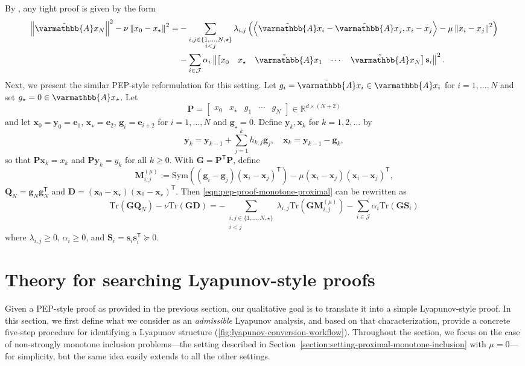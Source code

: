 \documentclass{article}
\theoremstyle{definition}
\theoremstyle{plain}
\newcommand{\ve}{{\mathbf{e}}}
\newcommand{\vg}{{\mathbf{g}}}
\newcommand{\vs}{{\mathbf{s}}}
\newcommand{\vx}{{\mathbf{x}}}
\newcommand{\vy}{{\mathbf{y}}}
\newcommand{\vD}{{\mathbf{D}}}
\newcommand{\vG}{{\mathbf{G}}}
\newcommand{\vM}{{\mathbf{M}}}
\newcommand{\vP}{{\mathbf{P}}}
\newcommand{\vQ}{{\mathbf{Q}}}
\newcommand{\vS}{{\mathbf{S}}}
\newcommand{\cJ}{{\mathcal{J}}}
\newcommand{\reals}{\mathbb{R}}
\newcommand{\opA}{{\varmathbb{A}}}
\newcommand{\inprod}[2]{\left\langle #1,#2 \right\rangle}
\newcommand{\sqnorm}[1]{\left\| #1 \right\|^2}
\newcommand{\topa}{\tilde{\opA}}
\newcommand{\transpose}{\mathsf{T}}
\begin{document}
By \citep{RyuTaylorBergelingGiselsson2020_operator}, any tight proof is given by the form
\begin{align}
\label{eqn:pep-proof-monotone-proximal}
\begin{aligned}
    \sqnorm{\topa x_N} - \nu \sqnorm{x_0 - x_\star} = & -\sum_{\substack{i,j \in \{1,\dots,N,\star\}\\ i<j}} \lambda_{i,j} \left( \inprod{\tilde{\opA} x_i - \tilde{\opA} x_j}{x_i - x_j} 
    - \mu \sqnorm{x_i - x_j} \right) \\
    & - \sum_{i\in \cJ} \alpha_i \sqnorm{\begin{bmatrix} x_0 & x_\star & \tilde{\opA} x_1 & \cdots & \tilde{\opA} x_N \end{bmatrix} \vs_i} .
\end{aligned}
\end{align}
Next, we present the similar PEP-style reformulation for this setting.
Let $g_i=\tilde{\opA}x_i\in \opA x_i$ for $i=1,\dots,N$ and set $g_\star = 0 \in \opA x_\star$.
Let
\[
    \vP = \begin{bmatrix}x_0 & x_\star & g_1 & \cdots & g_N\end{bmatrix}\in\reals^{d\times(N+2)}
\]
and let $\vx_0=\vy_0=\ve_1$, $\vx_\star=\ve_2$, $\vg_i=\ve_{i+2}$ for $i=1,\dots,N$ and $\vg_\star=0$.
Define $\vy_k, \vx_k$ for $k=1,2,\dots$ by
\[
    \vy_{k} = \vy_{k-1} + \sum_{j=1}^k h_{k,j} \vg_j , \quad \vx_k = \vy_{k-1} - \vg_k ,
\]
so that $\vP\vx_k=x_k$ and $\vP\vy_k = y_k$ for all $k\ge 0$.
With $\vG=\vP^\transpose\vP$, define
\[
    \vM_{i,j}^{(\mu)}
    :=
    \mathrm{Sym}\left((\vg_i-\vg_j)(\vx_i-\vx_j)^\transpose\right)
    -\mu(\vx_i-\vx_j)(\vx_i-\vx_j)^\transpose ,
\]
$\vQ_N=\vg_N\vg_N^\transpose$ and $\vD=(\vx_0-\vx_\star)(\vx_0-\vx_\star)^\transpose$.
Then \eqref{eqn:pep-proof-monotone-proximal} can be rewritten as
\[
    \mathrm{Tr}(\vG\vQ_N)-\nu\mathrm{Tr}(\vG\vD)
    =
    -\sum_{\substack{i,j \in \{1,\dots,N,\star\}\\ i<j}}\lambda_{i,j}\mathrm{Tr}(\vG\vM_{i,j}^{(\mu)})
    -\sum_{i\in\cJ}\alpha_i\mathrm{Tr}(\vG\vS_i)
\]
where $\lambda_{i,j}\ge0$, $\alpha_i\ge0$, and $\vS_i=\vs_i\vs_i^\transpose \succeq 0$.




\section{Theory for searching Lyapunov-style proofs}
\label{section:theory}

Given a PEP-style proof as provided in the previous section, our qualitative goal is to translate it into a simple Lyapunov-style proof.
In this section, we first define what we consider as an \emph{admissible} Lyapunov analysis, and based on that characterization, provide a concrete five-step procedure for identifying a Lyapunov structure (\cref{fig:lyapunov-conversion-workflow}).
Throughout the section, we focus on the case of non-strongly monotone inclusion problems---the setting described in Section~\ref{section:setting-proximal-monotone-inclusion} with $\mu=0$---for simplicity, but the same idea easily extends to all the other settings.
\end{document}
